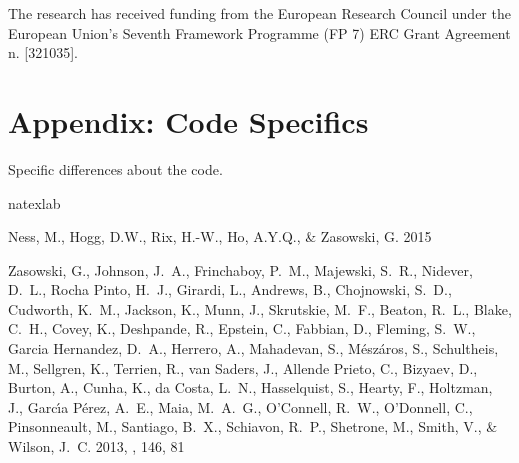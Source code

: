 \documentclass[12pt, preprint]{aastex}
\begin{document}
The research has received funding from the European Research Council under the 
European Union's Seventh Framework Programme (FP 7) ERC Grant Agreement n.
[321035].

\appendix
{}

\section{Appendix: Code Specifics}
Specific differences about the code.

\begin{thebibliography}{24}
\expandafter\ifx\csname natexlab\endcsname\relax\def\natexlab#1{#1}\fi

{Ness}, M., {Hogg}, D.W., {Rix}, H.-W., {Ho}, A.Y.Q., \& {Zasowski}, G. 2015

{Zasowski}, G., {Johnson}, J.~A., {Frinchaboy}, P.~M., {Majewski}, S.~R.,
  {Nidever}, D.~L., {Rocha Pinto}, H.~J., {Girardi}, L., {Andrews}, B.,
  {Chojnowski}, S.~D., {Cudworth}, K.~M., {Jackson}, K., {Munn}, J.,
  {Skrutskie}, M.~F., {Beaton}, R.~L., {Blake}, C.~H., {Covey}, K.,
  {Deshpande}, R., {Epstein}, C., {Fabbian}, D., {Fleming}, S.~W., {Garcia
  Hernandez}, D.~A., {Herrero}, A., {Mahadevan}, S., {M{\'e}sz{\'a}ros}, S.,
  {Schultheis}, M., {Sellgren}, K., {Terrien}, R., {van Saders}, J., {Allende
  Prieto}, C., {Bizyaev}, D., {Burton}, A., {Cunha}, K., {da Costa}, L.~N.,
  {Hasselquist}, S., {Hearty}, F., {Holtzman}, J., {Garc{\'{\i}}a P{\'e}rez},
  A.~E., {Maia}, M.~A.~G., {O'Connell}, R.~W., {O'Donnell}, C., {Pinsonneault},
  M., {Santiago}, B.~X., {Schiavon}, R.~P., {Shetrone}, M., {Smith}, V., \&
  {Wilson}, J.~C. 2013, \aj, 146, 81

\end{thebibliography}
\end{document}
